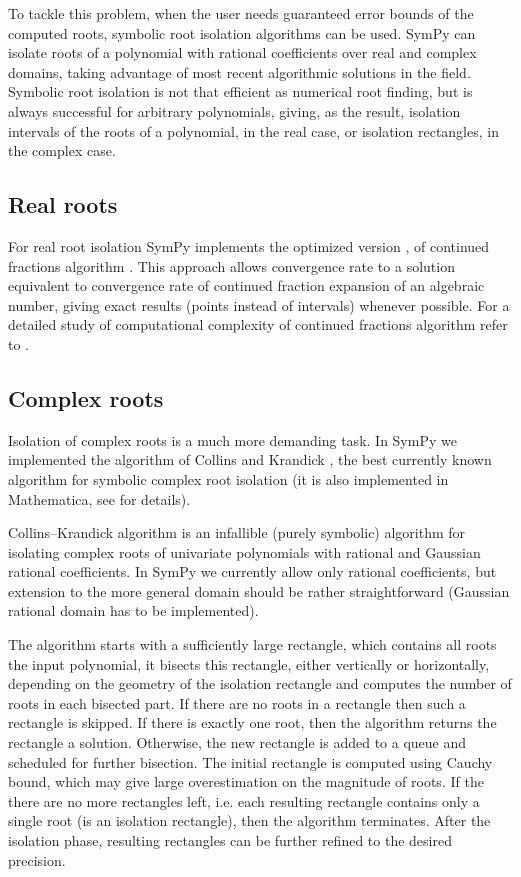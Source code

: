 To tackle this problem, when the user needs guaranteed error bounds of the computed roots,
symbolic root isolation algorithms can be used. SymPy can isolate roots of a polynomial with
rational coefficients over real and complex domains, taking advantage of most recent algorithmic
solutions in the field. Symbolic root isolation is not that efficient as numerical root finding,
but is always successful for arbitrary polynomials, giving, as the result, isolation intervals
of the roots of a polynomial, in the real case, or isolation rectangles, in the complex case.


\subsection{Real roots}

For real root isolation SymPy implements the optimized version \cite{Akritas2008study},
\cite{Akritas2008improving} of continued fractions algorithm \cite{Collins1976descarte}. This
approach allows convergence rate to a solution equivalent to convergence rate of continued
fraction expansion of an algebraic number, giving exact results (points instead of intervals)
whenever possible. For a detailed study of computational complexity of continued fractions
algorithm refer to \cite{Sharma2007complexity}.


\subsection{Complex roots}

Isolation of complex roots is a much more demanding task. In SymPy we implemented the algorithm
of Collins and Krandick \cite{Collins1992infallible}, the best currently known algorithm for symbolic
complex root isolation (it is also implemented in Mathematica, see \cite{MathematicaInternal} for
details).

Collins--Krandick algorithm is an infallible (purely symbolic) algorithm for isolating complex
roots of univariate polynomials with rational and Gaussian rational coefficients. In SymPy we
currently allow only rational coefficients, but extension to the more general domain should be
rather straightforward (Gaussian rational domain has to be implemented).

The algorithm starts with a sufficiently large rectangle, which contains all roots the input
polynomial, it bisects this rectangle, either vertically or horizontally, depending on the
geometry of the isolation rectangle and computes the number of roots in each bisected part.
If there are no roots in a rectangle then such a rectangle is skipped. If there is exactly
one root, then the algorithm returns the rectangle a solution. Otherwise, the new rectangle
is added to a queue and scheduled for further bisection. The initial rectangle is computed
using Cauchy bound, which may give large overestimation on the magnitude of roots. If the
there are no more rectangles left, i.e. each resulting rectangle contains only a single
root (is an isolation rectangle), then the algorithm terminates. After the isolation phase,
resulting rectangles can be further refined to the desired precision.

